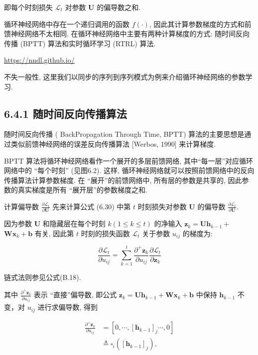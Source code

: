 \documentclass[10pt]{article}
\begin{document}
即每个时刻损失 $\mathcal{L}_{t}$ 对参数 $\boldsymbol{U}$ 的偏导数之和.

循环神经网络中存在一个递归调用的函数 $f(\cdot)$, 因此其计算参数梯度的方式和前馈神经网络不太相同. 在循环神经网络中主要有两种计算梯度的方式: 随时间反向传播 (BPTT) 算法和实时循环学习 (RTRL) 算法.

\href{https://nndl.github.io/}{https://nndl.github.io/}

不失一般性, 这里我们以同步的序列到序列模式为例来介绍循环神经网络的参数学习.

\subsection*{6.4.1 随时间反向传播算法}
随时间反向传播 ( BackPropagation Through Time, BPTT) 算法的主要思想是通过类似前馈神经网络的误差反向传播算法 [Werbos, 1990] 来计算梯度.

BPTT 算法将循环神经网络看作一个展开的多层前馈网络, 其中“每一层”对应循环网络中的 “每个时刻” (见图6.2). 这样, 循环神经网络就可以按照前馈网络中的反向传播算法计算参数梯度. 在 “展开”的前馈网络中, 所有层的参数是共享的, 因此参数的真实梯度是所有 “展开层”的参数梯度之和.

计算偏导数 $\frac{\partial \mathcal{L}_{t}}{\partial \boldsymbol{U}}$ 先来计算公式 (6.30) 中第 $t$ 时刻损失对参数 $\boldsymbol{U}$ 的偏导数 $\frac{\partial \mathcal{L}_{t}}{\partial \boldsymbol{U}}$.

因为参数 $\boldsymbol{U}$ 和隐藏层在每个时刻 $k(1 \leq k \leq t)$ 的净输入 $\boldsymbol{z}_{k}=\boldsymbol{U} \boldsymbol{h}_{k-1}+$ $\boldsymbol{W} \boldsymbol{x}_{k}+\boldsymbol{b}$ 有关, 因此第 $t$ 时刻的损失函数 $\mathcal{L}_{t}$ 关于参数 $u_{i j}$ 的梯度为:


\begin{equation*}
\frac{\partial \mathcal{L}_{t}}{\partial u_{i j}}=\sum_{k=1}^{t} \frac{\partial^{+} \boldsymbol{z}_{k}}{\partial u_{i j}} \frac{\partial \mathcal{L}_{t}}{\partial \boldsymbol{z}_{k}} \tag{6.31}
\end{equation*}


链式法则参见公式(B.18).

其中 $\frac{\partial^{+} \boldsymbol{z}_{k}}{\partial u_{i j}}$ 表示 “直接”偏导数, 即公式 $\boldsymbol{z}_{k}=\boldsymbol{U} \boldsymbol{h}_{k-1}+\boldsymbol{W} \boldsymbol{x}_{k}+\boldsymbol{b}$ 中保持 $\boldsymbol{h}_{k-1}$ 不变，对 $u_{i j}$ 进行求偏导数, 得到


\begin{align*}
\frac{\partial^{+} \boldsymbol{z}_{k}}{\partial u_{i j}} & =\left[0, \cdots,\left[\boldsymbol{h}_{k-1}\right]_{j} \cdots, 0\right]  \tag{6.32}\\
& \triangleq \mathbb{\square}_{i}\left(\left[\boldsymbol{h}_{k-1}\right]_{j}\right), \tag{6.33}
\end{align*}
\end{document}
